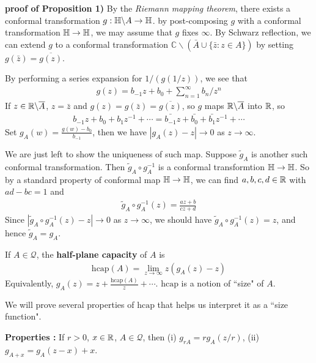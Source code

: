 \documentclass[12pt,a4paper]{article}
\newenvironment{proof}
{\begin{changemargin}{0.5cm}{0.5cm} 
	}%
	{\end{changemargin}
}
\newenvironment{p}
{\begin{proof} 
	}%
	{\end{proof}
}
\begin{document}
\begin{p}
\textbf{proof of Proposition 1)} By the \emph{Riemann mapping theorem}, there exists a conformal transformation $g: \mathbb{H} \backslash A \rightarrow \mathbb{H}$. by post-composing $g$ with a conformal transformation $\mathbb{H}\rightarrow \mathbb{H}$, we may assume that $g$ fixes $\infty$. By Schwarz reflection, we can extend $g$ to a conformal transformation $\mathbb{C} \backslash ( \bar{A} \cup \{\bar{z} : z\in A\})$ by setting $g(\bar{z}) = \overline{g(z)}$.

\quad By performing a series expansion for $1/(g(1/z))$, we see that
\begin{align*}
g(z) = b_{-1}z + b_0 + \sum_{n=1}^{\infty} b_n/z^n
\end{align*}
If $z\in \mathbb{R}\backslash \overline{A}$, $z= \bar{z}$ and $g(z) = g(\bar{z}) = \overline{g(z)}$, so $g$ maps $\mathbb{R} \backslash \overline{A}$ into $\mathbb{R}$, so
\begin{align*}
b_{-1} z + b_0 + b_1 z^{-1} + \cdots = \bar{b_{-1}}z + \bar{b_0} + \bar{b_1} z^{-1} + \cdots
\end{align*}
Set $g_A(w) = \frac{g(w)-b_0}{b_{-1}}$, then we have $|g_A(z) - z| \rightarrow 0$ as $z\rightarrow \infty$.

\quad We are just left to show the uniqueness of such map. Suppose $\tilde{g}_A$ is another such conformal transformation. Then $\tilde{g}_A \circ g_A^{-1}$ is a conformal transformtion $\mathbb{H} \rightarrow \mathbb{H}$. So by a standard property of conformal map $\mathbb{H} \rightarrow \mathbb{H}$, we can find $a, b,c,d\in \mathbb{R}$ with $ad-bc=1$ and
\begin{align*}
\tilde{g}_A \circ g_A^{-1} (z) = \frac{az+b}{cz+d}
\end{align*}
Since $|\tilde{g}_A \circ g_A^{-1} (z) -z| \rightarrow 0$ as $z\rightarrow \infty$, we should have $\tilde{g}_A \circ g_A^{-1} (z)=z$, and hence $\tilde{g}_A = g_A$.

\eop
\end{p}
\s

 If $A\in \mathscr{Q}$, the \textbf{half-plane capacity} of $A$ is
\begin{align*}
\text{hcap}(A) = \lim_{z\rightarrow \infty} z(g_A(z)-z)
\end{align*}
Equivalently, $g_A(z) = z + \frac{\text{hcap}(A)}{z} + \cdots$. $\text{hcap}$ is a notion of ``size" of $A$.

\quad We will prove several properties of $\text{hcap}$ that helps us interpret it as a ``size function".
\s

\textbf{Properties :} If $r>0$, $x\in \mathbb{R}$, $A\in \mathscr{Q}$, then (i) $g_{rA} = rg_A(z/r)$, (ii) $g_{A+x} = g_A(z-x)+x$.
\end{document}
